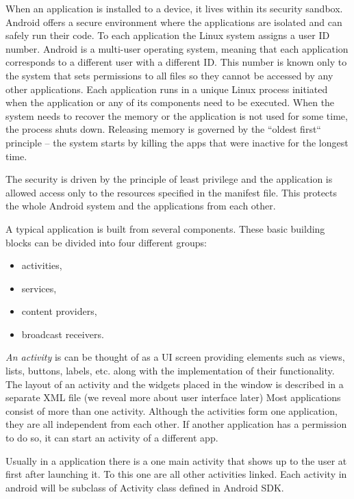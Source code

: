 When an application is installed to a device, it lives within its security sandbox.
Android offers a secure environment where the applications are isolated and can safely run their code.
To each application the Linux system assigns a user ID number. 
Android is a multi-user operating system, meaning that each application corresponds to a different user with a different ID.
This number is known only to the system that sets permissions to all files so they cannot be accessed by any other applications.
Each application runs in a unique Linux process initiated when the application or any of its components need to be executed.
When the system needs to recover the memory or the application is not used for some time, the process shuts down.
Releasing memory is governed by the ``oldest first`` principle -- the system starts by killing the apps that were inactive for the longest time.

The security is driven by the principle of least privilege and the application is allowed access only to the resources specified in the manifest file. 
This protects the whole Android system and the applications from each other.

A typical application is built from several components. 
These basic building blocks can be divided into four different groups:
\begin{itemize}
\item{activities,}
\item{services,}
\item{content providers,}
\item{broadcast receivers.}
\end{itemize}

\emph{An activity} is can be thought of as a UI screen providing elements such as views, lists, buttons, labels, etc. along with the implementation of their functionality.
The layout of an activity and the widgets placed in the window is described in a separate XML file (we reveal more about user interface later) 
Most applications consist of more than one activity.
Although the activities form one application, they are all independent from each other.
If another application has a permission to do so, it can start an activity of a different app.

Usually in a application there is a one main activity that shows up to the user at first after launching it.
To this one are all other activities linked.
Each activity in android will be subclass of Activity class defined in Android SDK.

